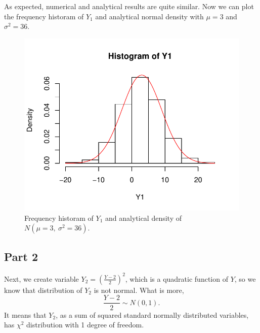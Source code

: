 \documentclass[12pt, a4paper]{article}\usepackage[]{graphicx}\usepackage[]{color}
\makeatletter
\def\maxwidth{ %
  \ifdim\Gin@nat@width>\linewidth
    \linewidth
  \else
    \Gin@nat@width
  \fi
}
\newenvironment{knitrout}{}{} %
\makeatother
\begin{document}
As expected, numerical and analytical results are quite similar.
Now we can plot the frequency historam of $Y_1$ and analytical normal density with $\mu=3$ and $\sigma^2=36$.
\begin{knitrout}
\color{fgcolor}\begin{figure}[H]

{\centering \includegraphics[width=\maxwidth]{figure/ex1_1hist-1} 

}

\caption[Frequency historam of $Y_1$ and analytical density of $N(\mu=3,\ \sigma^2=36)$]{Frequency historam of $Y_1$ and analytical density of $N(\mu=3,\ \sigma^2=36)$.}\label{fig:ex1.1hist}
\end{figure}


\end{knitrout}

\subsection{Part 2}
Next, we create variable $Y_2 = \left( \frac{Y-2}{2} \right)^2$, which is a quadratic function of $Y$, so we know that distribution of $Y_2$ is not normal. What is more, 
\[\frac{Y-2}{2} \sim N(0,1).\] 
It means that $Y_2$, as a sum of squared standard normally distributed variables, has $\chi^2$ distribution with 1 degree of freedom.
\end{document}
